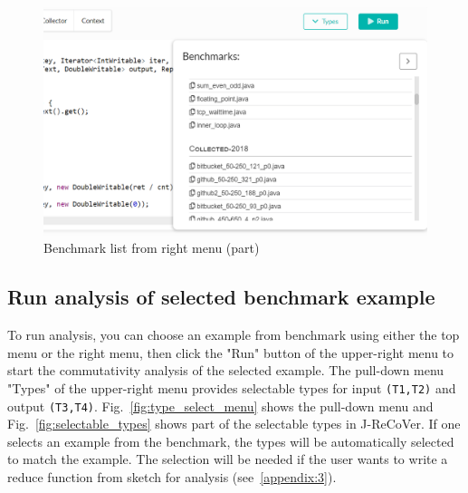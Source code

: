 \begin{figure}
\begin{center}
\includegraphics[width=.8\linewidth]{screenshots/benchmark_list_right}
\caption{Benchmark list from right menu (part)}
\label{fig:benchmark_list_right}
\end{center}
\end{figure}

\subsection{Run analysis of selected benchmark example}
\label{appendix:2}

To run analysis, you can choose an example from benchmark using either the top menu or the right menu, then click the "Run" button of the upper-right menu to start the commutativity analysis of the selected example. The pull-down menu "Types" of the upper-right menu provides selectable types for input \texttt{(T1,T2)} and output \texttt{(T3,T4)}. Fig.~\ref{fig:type_select_menu} shows the pull-down menu and Fig.~\ref{fig:selectable_types} shows part of the selectable types in J-ReCoVer. If one selects an example from the benchmark, the types will be automatically selected to match the example. The selection will be needed if the user wants to write a reduce function from sketch for analysis (see~\ref{appendix:3}).

